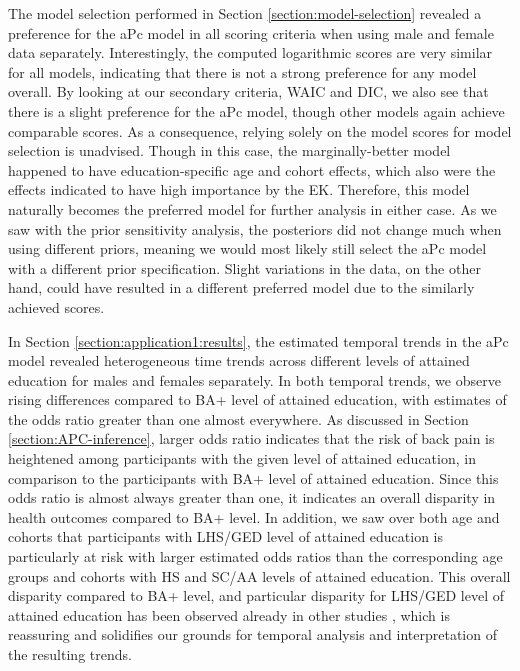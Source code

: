 \vspace{-0.2cm}
The model selection performed in Section \ref{section:model-selection} revealed a preference for the aPc model in all scoring criteria when using male and female data separately. Interestingly, the computed logarithmic scores are very similar for all models, indicating that there is not a strong preference for any model overall. By looking at our secondary criteria, WAIC and DIC, we also see that there is a slight preference for the aPc model, though other models again achieve comparable scores. As a consequence, relying solely on the model scores for model selection is unadvised. Though in this case, the marginally-better model happened to have education-specific age and cohort effects, which also were the effects indicated to have high importance by the EK. Therefore, this model naturally becomes the preferred model for further analysis in either case. As we saw with the prior sensitivity analysis, the posteriors did not change much when using different priors, meaning we would most likely still select the aPc model with a different prior specification. Slight variations in the data, on the other hand, could have resulted in a different preferred model due to the similarly achieved scores. 

\vspace{-0.2cm}
In Section \ref{section:application1:results}, the estimated temporal trends in the aPc model revealed heterogeneous time trends across different levels of attained education for males and females separately. In both temporal trends, we observe rising differences compared to BA+ level of attained education, with estimates of the odds ratio greater than one almost everywhere. As discussed in Section \ref{section:APC-inference}, larger odds ratio indicates that the risk of back pain is heightened among participants with the given level of attained education, in comparison to the participants with BA+ level of attained education. Since this odds ratio is almost always greater than one, it indicates an overall disparity in health outcomes compared to BA+ level. In addition, we saw over both age and cohorts that participants with LHS/GED level of attained education is particularly at risk with larger estimated odds ratios than the corresponding age groups and cohorts with HS and SC/AA levels of attained education. This overall disparity compared to BA+ level, and particular disparity for LHS/GED level of attained education has been observed already in other studies \citep{GEDdisparity}, which is reassuring and solidifies our grounds for temporal analysis and interpretation of the resulting trends.

